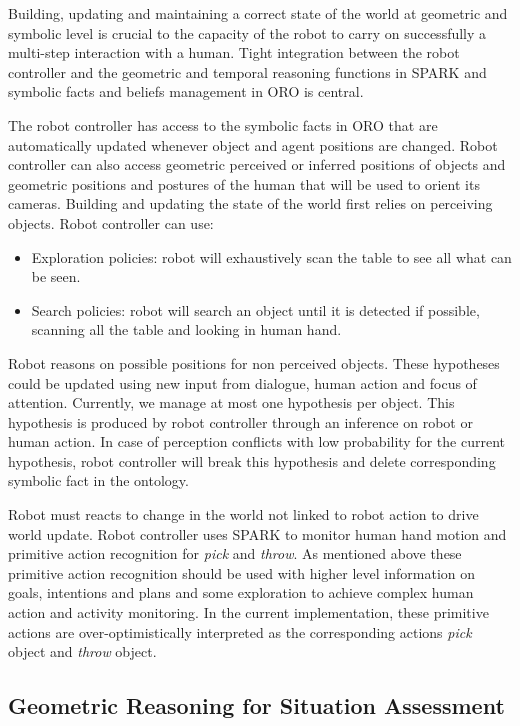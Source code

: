 \documentclass{svmult}
\begin{document}
Building, updating and maintaining a correct state of the world at
geometric and symbolic level is crucial to the capacity of the robot
to carry on successfully a multi-step interaction with a human. Tight
integration between the robot controller and the geometric and
temporal reasoning functions in SPARK and symbolic facts and beliefs
management in ORO is central.
 
The robot controller has access to the symbolic facts in ORO that are
automatically updated whenever object and agent positions are changed.
Robot controller can also access geometric perceived or inferred
positions of objects and geometric positions and postures of the human
that will be used to orient its cameras.  Building and updating the
state of the world first relies on perceiving objects. Robot
controller can use:

\begin {itemize}
\item Exploration policies: robot will exhaustively scan the table to
  see all what can be seen.

\item Search policies: robot will search an object until it is
  detected if possible, scanning all the table and looking in human
  hand.

\end {itemize} 

Robot reasons on possible positions for non perceived
objects. These hypotheses could be updated using new input from dialogue, human
action and focus of attention. Currently, we manage at most one hypothesis per
object. This hypothesis is produced by robot controller through an inference on
robot or human action. In case of perception conflicts with low probability for
the current hypothesis, robot controller will break this hypothesis and delete
corresponding symbolic fact in the ontology.

Robot must reacts to change in the world not linked to robot
action to drive world update. Robot controller uses SPARK to monitor human hand
motion and primitive action recognition for \emph{pick} and \emph{throw}. As
mentioned above these primitive action recognition should be used with higher
level information on goals, intentions and plans and some exploration to
achieve complex human action and activity monitoring.  In the current
implementation, these primitive actions are over-optimistically interpreted as
the corresponding actions \emph{pick} object and \emph{throw} object.

\subsection{Geometric Reasoning for Situation Assessment}
\label{spark}
\end{document}
